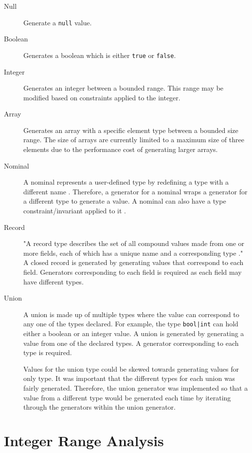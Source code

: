 \begin{description}
	\item[Null] Generate a \texttt{null} value.
	\item[Boolean] Generates a boolean which is either \texttt{true} or \texttt{false}.
	\item[Integer] Generates an integer between a bounded range. This range may be modified based on constraints applied to the integer.
	\item[Array] Generates an array with a specific element type between a bounded size range.
	The size of arrays are currently limited to a maximum size of three elements due to the performance cost of generating larger arrays.
	\item[Nominal] A nominal represents a user-defined type by redefining a type with a different name \cite{WhileyLang}. Therefore, a generator for a nominal wraps a generator for a different type to generate a value. A nominal can also have a type constraint/invariant applied to it \cite{WhileyLang}.
	\item[Record] "A record type describes the set of all compound values made from one or more fields, each of which has a unique name and a corresponding type \cite{WhileyLang}."
	A closed record is generated by generating values that correspond to each field. Generators corresponding to each field is required as each field may have different types. %
	\item[Union] A union is made up of multiple types where the value can correspond to any one of the types declared. For example, the type \texttt{bool|int} can hold either a boolean or an integer value. 
	A union is generated by generating a value from one of the declared types. A generator corresponding to each type is required. 
	
	Values for the union type could be skewed towards generating values for only type. It was important that the different types for each union was fairly generated. Therefore, the union generator was implemented so that a value from a different type would be generated each time by iterating through the generators within the union generator.

\end{description}

\section{Integer Range Analysis}

